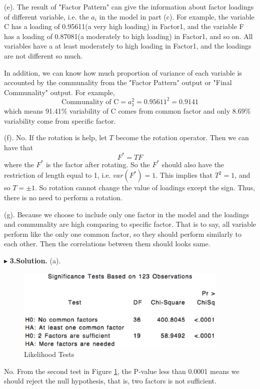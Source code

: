 \documentclass[letterpaper, 12pt]{article}
\begin{document}
(e). The result of "Factor Pattern" can give the information about factor loadings of different variable, i.e. the $a_i$ in the model in part (c). For example, the variable C has a loading of 0.95611(a very high loading) in Factor1, and the variable F has a loading of 0.87081(a moderately to high loading) in Factor1, and so on. All variables have a at least moderately to high loading in Factor1, and the loadings are not different so much.

In addition, we can know how much proportion of variance of each variable is accounted by the communality from the "Factor Pattern" output or "Final Communality" output. For example, 
$$
\text{Communality of C}=a_1^2=0.95611^2=0.9141
$$
which means 91.41\% variability of C comes from common factor and only 8.69\% variability come from specific factor.

(f). No. If the rotation is help, let $T$ become the rotation operator. Then we can have that
$$
F^*=TF
$$
where the $F^*$ is the factor after rotating. So the $F^*$ should also have the restriction of length equal to 1, i.e. $var(F^*)=1$. This implies that $T^2=1$, and so $T=\pm1$. So rotation cannot change the value of loadings except the sign. Thus, there is no need to perform a rotation.


(g). Because we choose to include only one factor in the model and the loadings and communality are high comparing to specific factor. That is to say, all variable perform like the only one common factor, so they should perform similarly to each other. Then the correlations between them should looks same.








$\blacktriangleright$ \textbf{3.\quad Solution.} 
(a). \begin{figure}[htbp]
\centering\includegraphics[width=4in]{7-6.eps}
\caption{Likelihood Tests}\label{6}
\end{figure}

No. From the second test in Figure \ref{6}, the P-value less than 0.0001 means we should reject the null hypothesis, that is, two factors is not sufficient.
\end{document}
